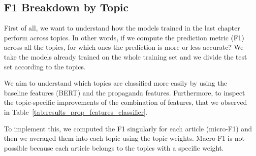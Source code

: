 \subsection{\statusgreen F1 Breakdown by Topic}
\label{sec:topic_classifier_propaganda_f1_across}

First of all, we want to understand how the models trained in the last chapter perform across topics. In other words, if we compute the prediction metric (F1) across all the topics, for which ones the prediction is more or less accurate?
We take the models already trained on the whole training set and we divide the test set according to the topics.

We aim to understand which topics are classified more easily by using the baseline features (BERT) and the propaganda features. Furthermore, to inspect the topic-specific improvements of the combination of features, that we observed in Table~\ref{tab:results_prop_features_classifier}. 

To implement this, we computed the F1 singularly for each article (micro-F1) and then we averaged them into each topic using the topic weights. Macro-F1 is not possible because each article belongs to the topics with a specific weight.

